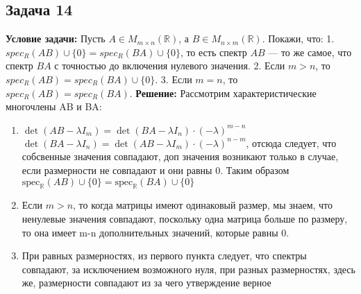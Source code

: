 \documentclass[a4paper,12pt]{article}
\begin{document}
\subsection{Задача 14}
\textbf{Условие задачи:}
Пусть $A \in M_{m \times n}(\mathbb{R})$, а $B \in M_{n \times m}(\mathbb{R})$. Покажи, что:
1. $spec_R(AB) \cup \{0\} = spec_R(BA) \cup \{0\}$, то есть спектр $AB$ — то же самое, что спектр $BA$ с точностью до включения нулевого значения.
2. Если $m > n$, то $spec_R(AB) = spec_R(BA) \cup \{0\}$.
3. Если $m = n$, то $spec_R(AB) = spec_R(BA)$.
\textbf{Решение: }
Рассмотрим характеристические многочлены AB и BA:\\
\begin{enumerate}
    
\item $\det(AB - \lambda I_m) = \det(BA - \lambda I_n) \cdot (-\lambda)^{m-n}$\\
$\det(BA - \lambda I_n) = \det(AB - \lambda I_m) \cdot (-\lambda)^{n-m}$, отсюда следует, что собсвенные значения совпадают, доп значения возникают только в случае, если размерности не совпадают и они равны 0. Таким образом $\text{spec}_\mathbb{R}(AB) \cup \{0\} = \text{spec}_\mathbb{R}(BA) \cup \{0\}$
\item Если \( m > n \), то когда матрицы имеют одинаковый размер, мы знаем, что ненулевые значения совпадают, поскольку одна матрица больше по размеру, то она имеет m-n дополнительных значений, которые равны 0.
\item При равных размерностях, из первого пункта следует, что спектры совпадают, за исключением возможного нуля, при разных размерностях, здесь же, размерности совпадают из за чего утверждение верное
\end{enumerate}
\end{document}
